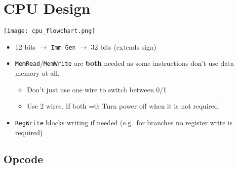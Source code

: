 \section{CPU Design}\label{cpu design}

\begin{center}
    \texttt{[image: cpu\_flowchart.png]}
\end{center}

\newpar{}
\begin{itemize}
    \item 12 bits $\to$ \texttt{Imm Gen} $\to$ 32 bits (extends sign)
    \item \texttt{MemRead}/\texttt{MemWrite} are \textbf{both} needed as some instructions don't use data memory at all.
          \begin{itemize}
              \item Don't just use one wire to switch between 0/1
              \item Use 2 wires. If both =0: Turn power off when it is not required.
          \end{itemize}
    \item \texttt{RegWrite} blocks writing if needed (e.g.\ for branches no register write is required)
\end{itemize}

\subsection{Opcode}

